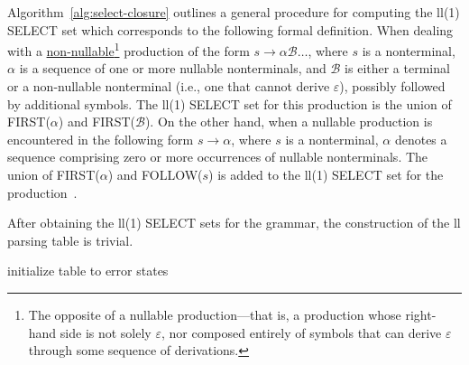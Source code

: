 \begingroup
\vspace{1.5em}
\begin{algorithm}[H]
  \setlength{\algomargin}{1.5em}
  
  \caption{The \gls{ll}(1) SELECT algorithm.}
  \label{alg:select-closure}
\end{algorithm}
\vspace{1.5em}
\endgroup

Algorithm~\ref{alg:select-closure} outlines a general procedure for computing the \gls{ll}(1) SELECT set which corresponds to the following formal definition. When dealing with a \underline{non-nullable}\footnote{The opposite of a nullable production—that is, a production whose right-hand side is not solely $\varepsilon$, nor composed entirely of symbols that can derive $\varepsilon$ through some sequence of derivations.
} production of the form $s\rightarrow \alpha \mathcal{B} \dots$, where $s$ is a nonterminal, $\alpha$ is a sequence of one or more nullable nonterminals, and $\mathcal{B}$ is either a terminal or a non-nullable nonterminal (i.e., one that cannot derive $\varepsilon$), possibly followed by additional symbols. The \gls{ll}(1) SELECT set for this production is the union of FIRST($\alpha$) and FIRST($\mathcal{B}$).
On the other hand, when a nullable production is encountered in the following form $s\rightarrow \alpha$, where $s$ is a nonterminal, $\alpha$ denotes a sequence comprising zero or more occurrences of nullable nonterminals. The union of FIRST($\alpha$) and FOLLOW($s$) is added to the \gls{ll}(1) SELECT set for the production~\cite[Chapter~4.7.3]{Holub_1990}.


After obtaining the \gls{ll}(1) SELECT sets for the grammar, the construction of the \gls{ll} parsing table is trivial. 

\begingroup
\vspace{1.5em}
\begin{algorithm}[H]\label{alg:select-to-table}
  \setlength{\algomargin}{1.5em}
  initialize table to error states
  
  \caption{Translation of \gls{ll}(1) SELECT sets to a parse table.}
\end{algorithm}
\vspace{1.5em}
\endgroup


